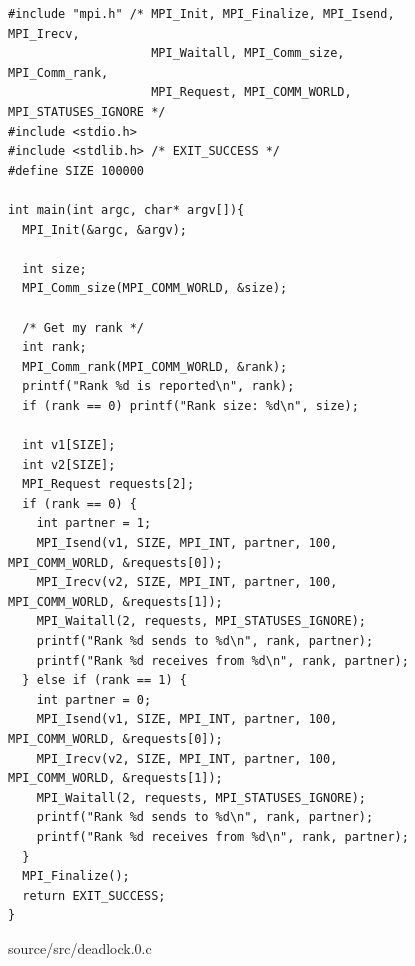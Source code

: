 \documentclass[12pt]{article}
\begin{document}
\begin{figure}[h!]
	\begin{verbatim}
#include "mpi.h" /* MPI_Init, MPI_Finalize, MPI_Isend, MPI_Irecv,
                    MPI_Waitall, MPI_Comm_size, MPI_Comm_rank,
                    MPI_Request, MPI_COMM_WORLD, MPI_STATUSES_IGNORE */
#include <stdio.h>
#include <stdlib.h> /* EXIT_SUCCESS */
#define SIZE 100000

int main(int argc, char* argv[]){
  MPI_Init(&argc, &argv);

  int size;
  MPI_Comm_size(MPI_COMM_WORLD, &size);

  /* Get my rank */
  int rank;
  MPI_Comm_rank(MPI_COMM_WORLD, &rank);
  printf("Rank %d is reported\n", rank);
  if (rank == 0) printf("Rank size: %d\n", size);

  int v1[SIZE];
  int v2[SIZE];
  MPI_Request requests[2];
  if (rank == 0) {
    int partner = 1;
    MPI_Isend(v1, SIZE, MPI_INT, partner, 100, MPI_COMM_WORLD, &requests[0]);
    MPI_Irecv(v2, SIZE, MPI_INT, partner, 100, MPI_COMM_WORLD, &requests[1]);
    MPI_Waitall(2, requests, MPI_STATUSES_IGNORE);
    printf("Rank %d sends to %d\n", rank, partner);
    printf("Rank %d receives from %d\n", rank, partner);
  } else if (rank == 1) {
    int partner = 0;
    MPI_Isend(v1, SIZE, MPI_INT, partner, 100, MPI_COMM_WORLD, &requests[0]);
    MPI_Irecv(v2, SIZE, MPI_INT, partner, 100, MPI_COMM_WORLD, &requests[1]);
    MPI_Waitall(2, requests, MPI_STATUSES_IGNORE);
    printf("Rank %d sends to %d\n", rank, partner);
    printf("Rank %d receives from %d\n", rank, partner);
  }
  MPI_Finalize();
  return EXIT_SUCCESS;
}
	\end{verbatim}
	\caption{source/src/deadlock.0.c}\label{code:deadlockc}
\end{figure}

\newpage
\end{document}
